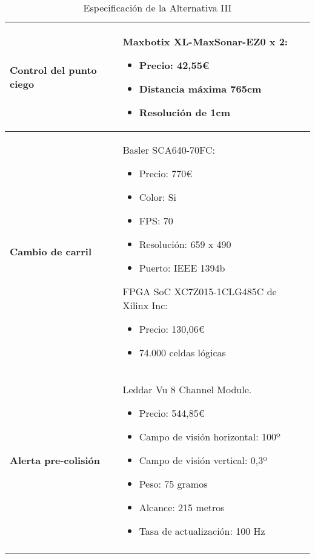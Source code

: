 \begin{center}
\begin{longtable}{p{5cm} p{8cm}}
\textbf{Control del punto ciego} &
Maxbotix XL-MaxSonar-EZ0 x 2:
\begin{itemize}
    \item Precio: 42,55\euro
    \item Distancia máxima 765cm
    \item Resolución de 1cm
\end{itemize}
\\ \hline

\textbf{Cambio de carril} &
Basler SCA640-70FC:
\begin{itemize}
    \item Precio: 770\euro
    \item Color: Si
    \item FPS: 70
    \item Resolución: 659 x 490
    \item Puerto: IEEE 1394b
\end{itemize}
FPGA SoC XC7Z015-1CLG485C de Xilinx Inc:
\begin{itemize}
    \item Precio: 130,06\euro
    \item 74.000 celdas lógicas
\end{itemize}
\\ \hline

\textbf{Alerta pre-colisión} &
Leddar Vu 8 Channel Module.
\begin{itemize}
    \item Precio: 544,85\euro
    \item Campo de visión horizontal: 100º
    \item Campo de visión vertical: 0,3º
    \item Peso: 75 gramos
    \item Alcance: 215 metros
    \item Tasa de actualización: 100 Hz
\end{itemize}
\\
\caption{Especificación de la Alternativa III}
\label{tab:altIII}
\end{longtable}
\end{center}
